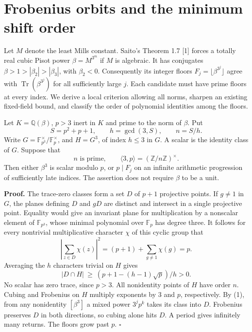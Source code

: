 \documentclass[11pt,a4paper,oneside,openany]{book}
\newcommand{\Q}{\mathbb Q}\newcommand{\C}{\mathbb C}\newcommand{\Z}{\mathbb Z}\newcommand{\F}{\mathbb F}\newcommand{\Tr}{\operatorname{Tr}}\newcommand{\Nm}{\operatorname{N}}\newcommand{\ord}{\operatorname{ord}}\newcommand{\K}{K}\newcommand{\OO}{\mathcal O_K}\newcommand{\unit}{\mathcal U}
\begin{document}
\chapter{Frobenius orbits and the minimum shift order}\label{ch:frob}
Let $M$ denote the least Mills constant. Saito's Theorem 1.7 [1] forces a totally real cubic Pisot power $\beta=M^{3^m}$ if $M$ is algebraic. It has conjugates $\beta>1>|\beta_2|>|\beta_3|$, with $\beta_2<0$. Consequently its integer floors $F_j=\lfloor\beta^{3^j}\rfloor$ agree with $\Tr(\beta^{3^j})$ for all sufficiently large $j$. Each candidate must have prime floors at every index. We derive a local criterion allowing all norms, sharpen an existing fixed-field bound, and classify the order of polynomial identities among the floors.

Let $K=\Q(\beta)$, $p>3$ inert in $K$ and prime to the norm of $\beta$. Put
\[
 S=p^2+p+1,\qquad h=\gcd(3,S),\qquad n=S/h.
\]
Write $G=\F_{p^3}^{\times}/\F_p^\times$, and $H=G^3$, of index $h\le3$ in $G$. A scalar is the identity class of $G$. Suppose that
\[
              n\text{ is prime},\qquad
          \langle3,p\rangle=(\Z/n\Z)^\times.                      \tag{1}
\]
Then either $\beta^3$ is scalar modulo $p$, or $p\mid F_j$ on an infinite arithmetic progression of sufficiently late indices. The assertion does not require $\beta$ to be a unit.

\textbf{Proof.} The trace-zero classes form a set $D$ of $p+1$ projective points. If $g\ne1$ in $G$, the planes defining $D$ and $gD$ are distinct and intersect in a single projective point. Equality would give an invariant plane for multiplication by a nonscalar element of $\F_{p^3}$, whose minimal polynomial over $\F_p$ has degree three. It follows for every nontrivial multiplicative character $\chi$ of this cyclic group that
\[
 \left|\sum_{z\in D}\chi(z)\right|^2
 =(p+1)+\sum_{g\ne1}\chi(g)=p.
\]
Averaging the $h$ characters trivial on $H$ gives
\[
              |D\cap H|\ \ge\ (p+1-(h-1)\sqrt p)/h>0.
\]
No scalar has zero trace, since $p>3$. All nonidentity points of $H$ have order $n$. Cubing and Frobenius on $H$ multiply exponents by $3$ and $p$, respectively. By (1), from any nonidentity $[\beta^3]$ a mixed power $3^j p^k$ takes its class into $D$. Frobenius preserves $D$ in both directions, so cubing alone hits $D$. A period gives infinitely many returns. The floors grow past $p$. \hfill$\square$
\end{document}
